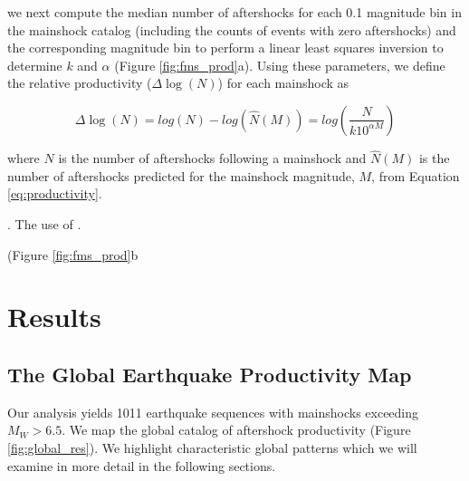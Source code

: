 \documentclass[draft, jgrga]{agujournal2018}
\begin{document}
 we next compute the median number of aftershocks for each 0.1 magnitude bin in the mainshock catalog (including the counts of events with zero aftershocks) and the corresponding magnitude bin to perform a linear least squares inversion to determine $k$ and $\alpha$ (Figure \ref{fig:fms_prod}a). Using these parameters, we define the relative productivity ($\Delta \log(N)$) for each mainshock as
%
\begin{linenomath*}
\begin{equation}
    \Delta \log(N) = log(N) - log(\hat{N}(M)) = log\left(\dfrac{N}{k10^{\alpha M}}\right)
    \label{eq:residual_productivity}
\end{equation}
\end{linenomath*}
%
where $N$ is the number of aftershocks following a mainshock and $\hat{N}(M)$ is the number of aftershocks predicted for the mainshock magnitude, $M$, from Equation \ref{eq:productivity}.

 \citep[e.g.][]{Page, Hardebeck2018UpdatedParameters, Utsu1995,Ogata1988}. The use of .

 (Figure \ref{fig:fms_prod}b 

\section{Results}
    \subsection{The Global Earthquake Productivity Map}\label{sec:glob}

    Our analysis yields 1011 earthquake sequences with mainshocks exceeding $M_W>6.5$. We map the global catalog of aftershock productivity (Figure \ref{fig:global_res}). We highlight characteristic global patterns which we will examine in more detail in the following sections.
\end{document}
